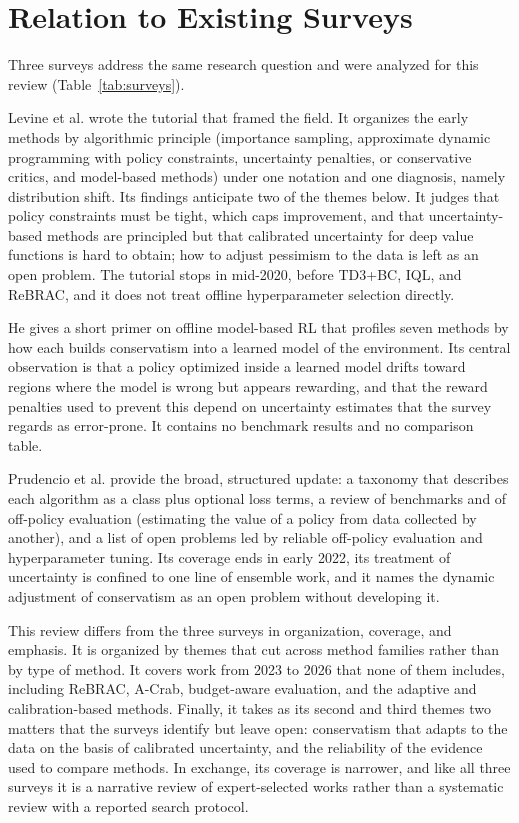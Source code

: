 \documentclass[conference]{IEEEtran}
\begin{document}
\section{Relation to Existing Surveys}
\label{sec:surveys}
Three surveys address the same research question and were analyzed for this review (Table~\ref{tab:surveys}).

Levine et al. \cite{levine2020tutorial} wrote the tutorial that framed the field. It organizes the early methods by algorithmic principle (importance sampling, approximate dynamic programming with policy constraints, uncertainty penalties, or conservative critics, and model-based methods) under one notation and one diagnosis, namely distribution shift. Its findings anticipate two of the themes below. It judges that policy constraints must be tight, which caps improvement, and that uncertainty-based methods are principled but that calibrated uncertainty for deep value functions is hard to obtain; how to adjust pessimism to the data is left as an open problem. The tutorial stops in mid-2020, before TD3+BC, IQL, and ReBRAC, and it does not treat offline hyperparameter selection directly.

He \cite{he2023survey} gives a short primer on offline model-based RL that profiles seven methods by how each builds conservatism into a learned model of the environment. Its central observation is that a policy optimized inside a learned model drifts toward regions where the model is wrong but appears rewarding, and that the reward penalties used to prevent this \cite{kidambi2020morel,yu2020mopo} depend on uncertainty estimates that the survey regards as error-prone. It contains no benchmark results and no comparison table.

Prudencio et al. \cite{prudencio2024survey} provide the broad, structured update: a taxonomy that describes each algorithm as a class plus optional loss terms, a review of benchmarks and of off-policy evaluation (estimating the value of a policy from data collected by another), and a list of open problems led by reliable off-policy evaluation and hyperparameter tuning. Its coverage ends in early 2022, its treatment of uncertainty is confined to one line of ensemble work, and it names the dynamic adjustment of conservatism as an open problem without developing it.

This review differs from the three surveys in organization, coverage, and emphasis. It is organized by themes that cut across method families rather than by type of method. It covers work from 2023 to 2026 that none of them includes, including ReBRAC, A-Crab, budget-aware evaluation, and the adaptive and calibration-based methods. Finally, it takes as its second and third themes two matters that the surveys identify but leave open: conservatism that adapts to the data on the basis of calibrated uncertainty, and the reliability of the evidence used to compare methods. In exchange, its coverage is narrower, and like all three surveys it is a narrative review of expert-selected works rather than a systematic review with a reported search protocol.
\end{document}
